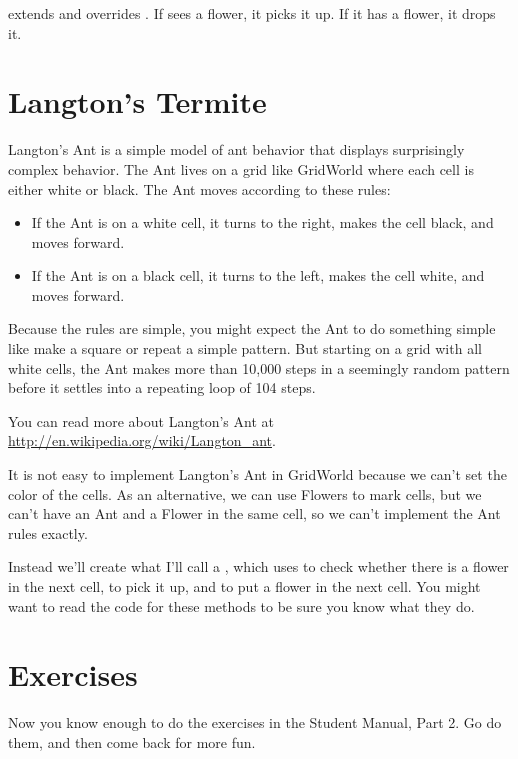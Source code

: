  extends  and overrides .
If  sees a flower, it picks it up.
If it has a flower, it drops it.


\section{Langton's Termite}

Langton's Ant is a simple model of ant behavior that displays surprisingly complex behavior.
The Ant lives on a grid like GridWorld where each cell is either white or black.
The Ant moves according to these rules:

\begin{itemize}

\item If the Ant is on a white cell, it turns to the right, makes the cell black, and moves forward.

\item If the Ant is on a black cell, it turns to the left, makes the cell white, and moves forward.

\end{itemize}

Because the rules are simple, you might expect the Ant to do something simple like make a square or repeat a simple pattern.
But starting on a grid with all white cells, the Ant makes more than 10,000 steps in a seemingly random pattern before it settles into a repeating loop of 104 steps.

You can read more about Langton's Ant at \url{http://en.wikipedia.org/wiki/Langton_ant}.

It is not easy to implement Langton's Ant in GridWorld because we can't set the color of the cells.
As an alternative, we can use Flowers to mark cells, but we can't have an Ant and a Flower in the same cell, so we can't implement the Ant rules exactly.

Instead we'll create what I'll call a , which uses  to check whether there is a flower in the next cell,  to pick it up, and  to put a flower in the next cell.
You might want to read the code for these methods to be sure you know what they do.


\section{Exercises}


\begin{exercise}
Now you know enough to do the exercises in the Student Manual, Part 2.
Go do them, and then come back for more fun.
\end{exercise}


